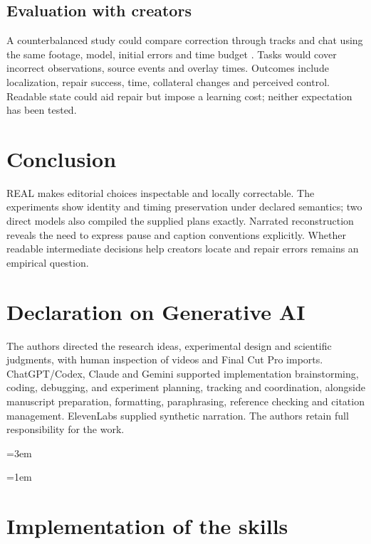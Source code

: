 \documentclass{ceurart}
\begin{document}
\subsection{Evaluation with creators}\label{evaluation-with-creators}

A counterbalanced study could compare correction through tracks and chat
using the same footage, model, initial errors and time budget
\citep{haupt2025centaur}. Tasks would cover incorrect observations,
source events and overlay times. Outcomes include localization, repair
success, time, collateral changes and perceived control. Readable state
could aid repair but impose a learning cost; neither expectation has
been tested.

\section{Conclusion}\label{conclusion}

REAL makes editorial choices inspectable and locally correctable. The
experiments show identity and timing preservation under declared
semantics; two direct models also compiled the supplied plans exactly.
Narrated reconstruction reveals the need to express pause and caption
conventions explicitly. Whether readable intermediate decisions help
creators locate and repair errors remains an empirical question.

\section*{Declaration on Generative
AI}\label{declaration-on-generative-ai}

The authors directed the research ideas, experimental design and
scientific judgments, with human inspection of videos and Final Cut Pro
imports. ChatGPT/Codex, Claude and Gemini supported implementation
brainstorming, coding, debugging, and experiment planning, tracking and
coordination, alongside manuscript preparation, formatting,
paraphrasing, reference checking and citation management. ElevenLabs
supplied synthetic narration. The authors retain full responsibility for
the work.

\emergencystretch=3em

\appendix
\emergencystretch=1em
\section{Implementation of the
skills}\label{implementation-of-the-skills}
\end{document}
